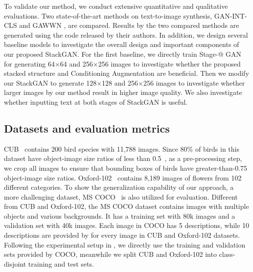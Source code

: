 \documentclass[10pt,twocolumn,letterpaper]{article}
\makeatletter
\newcommand{\Rmnum}[1]{\expandafter\@slowromancap\romannumeral #1@}
\makeatother
\begin{document}
To validate our method, we conduct extensive quantitative and qualitative evaluations. Two state-of-the-art methods on text-to-image synthesis, GAN-INT-CLS \cite{reed2016generative} and GAWWN \cite{reed2016learning}, are compared. Results by the two compared methods are generated using the code released by their authors. In addition, we design several baseline models to investigate the overall design and important components of our proposed StackGAN. For the first baseline, we directly train Stage-\Rmnum{1} GAN for generating 64$\times$64 and 256$\times$256 images to investigate whether the proposed stacked structure and Conditioning Augmentation are beneficial. Then we modify our StackGAN to generate 128$\times$128 and 256$\times$256 images to investigate whether larger images by our method result in higher image quality. We also investigate whether inputting text at both stages of StackGAN is useful. 


\vspace{-2pt}
\subsection{Datasets and evaluation metrics} 
\vspace{-5pt}

CUB~\cite{WahCUB_200_2011} contains 200 bird species with 11,788 images. Since 80\% of birds in this dataset have object-image size ratios of less than 0.5~\cite{WahCUB_200_2011}, as a pre-processing step, we crop all images to ensure that bounding boxes of birds have greater-than-0.75 object-image size ratios. Oxford-102~\cite{Nilsback08} contains 8,189 images of flowers from 102 different categories. To show the generalization capability of our approach, a more challenging dataset, MS COCO~\cite{LinMBHPRDZ14} is also utilized for evaluation. Different from CUB and Oxford-102, the MS COCO dataset contains images with multiple objects and various backgrounds. It has a training set with 80k images and a validation set with 40k images. Each image in COCO has 5 descriptions, while 10 descriptions are provided by \cite{reed2016cvpr} for every image in CUB and Oxford-102 datasets. Following the experimental setup in \cite{reed2016generative}, we directly use the training and validation sets provided by COCO, meanwhile we split CUB and Oxford-102 into class-disjoint training and test sets. 
\end{document}
